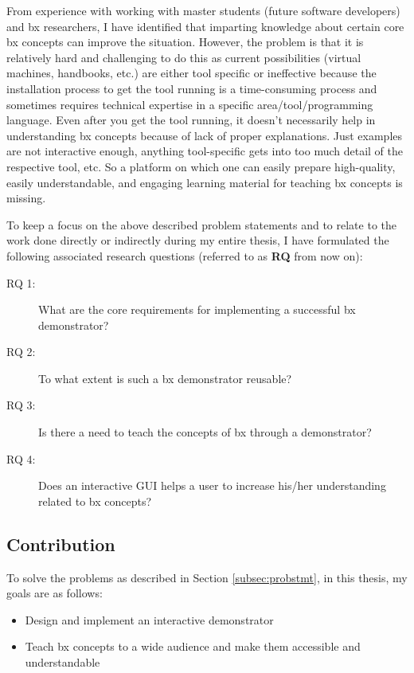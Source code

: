 From experience with working with master students (future software developers) and bx researchers, I have identified that imparting knowledge about certain core bx concepts can improve the situation. However, the problem is that it is relatively hard and challenging to do this as current possibilities (virtual machines, handbooks, etc.) are either tool specific or ineffective because the installation process to get the tool running is a time-consuming process and sometimes requires technical expertise in a specific area/tool/programming language. Even after you get the tool running, it doesn't necessarily help in understanding bx concepts because of lack of proper explanations. Just examples are not interactive enough, anything tool-specific gets into too much detail of the respective tool, etc. So a platform on which one can easily prepare high-quality, easily understandable, and engaging learning material for teaching bx concepts is missing.

To keep a focus on the above described problem statements and to relate to the work done directly or indirectly during my entire thesis, I have formulated the following associated research questions (referred to as \textbf{RQ} from now on):

\begin{description}
	\item [RQ 1:] What are the core requirements for implementing a successful bx demonstrator?
	\item [RQ 2:] To what extent is such a bx demonstrator reusable?
	\item [RQ 3:] Is there a need to teach the concepts of bx through a demonstrator?
	\item [RQ 4:] Does an interactive GUI helps a user to increase his/her understanding related to bx concepts?
\end{description}

\subsection{Contribution}\label{subsec:contribution}
To solve the problems as described in Section \ref{subsec:probstmt}, in this thesis, my goals are as follows:
\begin{itemize} 
\item {Design and implement an interactive demonstrator} 
\item {Teach bx concepts to a wide audience and make them accessible and understandable}
\end{itemize}

